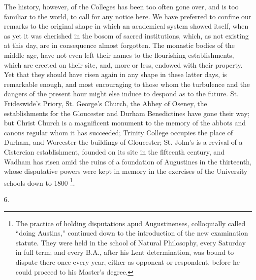The history, however, of the
Colleges has been too often gone over, and is too familiar to the
world, to call for any notice here. We have preferred to confine our
remarks to the original shape in which an academical system showed
itself, when as yet it was cherished in the bosom of sacred
institutions, which, as not existing at this day, are in consequence
almost forgotten. The monastic bodies of the middle age, have not even
left their names to the flourishing establishments, which are erected
on their site, and, more or less, endowed with their property. Yet
that they should have risen again in any shape in these latter days,
is remarkable enough, and most encouraging to those whom the
turbulence and the dangers of the present hour might else induce to
despond as to the future. St. Frideswide's Priory, St. George's
Church, the Abbey of Oseney, the establishments for the Gloucester and
Durham Benedictines have gone their way; but Christ Church is a
magnificent monument to the memory of the abbots and canons regular
whom it has succeeded; Trinity College occupies the place of Durham,
and Worcester the buildings of Gloucester; St. John's is a revival of
a Cistercian establishment, founded on its site in the fifteenth
century, and Wadham has risen amid the ruins of a foundation of
Augustines in the thirteenth, whose disputative powers were kept in
memory in the exercises of the University schools down to 1800 \footnote{

The practice of holding
disputations apud Augustinenses, colloquially called ``doing Austins,''
continued down to the introduction of the new examination statute.
They were held in the school of Natural Philosophy, every Saturday in
full term; and every B.A., after his Lent determination, was bound to
dispute there once every year, either as opponent or respondent,
before he could proceed to his Master's degree.}.

6.

